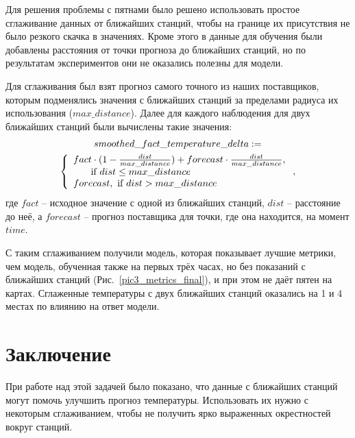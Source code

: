 \documentclass[14pt]{matmex-diploma}
\begin{document}
Для решения проблемы с пятнами было решено использовать простое сглаживание данных от ближайших станций, чтобы на границе их присутствия не было резкого скачка в значениях. Кроме этого в данные для обучения были добавлены расстояния от точки прогноза до ближайших станций, но по результатам экспериментов они не оказались полезны для модели.

Для сглаживания был взят прогноз самого точного из наших поставщиков, которым подменялись значения с ближайших станций за пределами радиуса их использования ($max\_distance$). Далее для каждого наблюдения для двух ближайших станций были вычислены такие значения: 
\begingroup
\setlength\abovedisplayskip{0pt}
\begin{multline*}
smoothed\_fact\_temperature\_delta := \\\left\{
                \begin{array}{ll}
                  fact \cdot (1 - \frac{dist}{max\_distance}) + forecast \cdot \frac{dist}{max\_distance},\\\indent \text{     if }dist \le max\_distance  \\
                  forecast, \text{ if } dist > max\_distance
                \end{array}
              \right.,
\end{multline*}
\endgroup
\indent где $fact$ -- исходное значение с одной из ближайших станций, $dist$ -- расстояние до неё, а $forecast$ -- прогноз поставщика для точки, где она находится, на момент $time$.

С таким сглаживанием получили модель, которая показывает лучшие метрики, чем модель, обученная также на первых трёх часах, но без показаний с ближайших станций (Рис.~\ref{pic3_metrics_final}), и при этом не даёт пятен на картах. Сглаженные температуры с двух ближайших станций оказались на 1 и 4 местах по влиянию на ответ модели.



\section*{Заключение}
При работе над этой задачей было показано, что данные с ближайших станций могут помочь улучшить прогноз температуры.  Использовать их нужно с некоторым сглаживанием, чтобы не получить ярко выраженных окрестностей вокруг станций.
\end{document}
